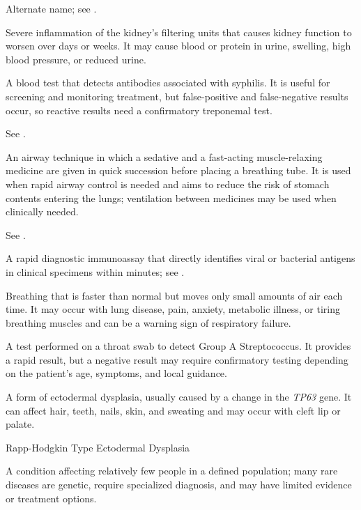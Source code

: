  Alternate name; see .

 Severe inflammation of the kidney’s filtering units that causes kidney function to worsen over days or weeks. It may cause blood or protein in urine, swelling, high blood pressure, or reduced urine.

 A blood test that detects antibodies associated with syphilis. It is useful for screening and monitoring treatment, but false-positive and false-negative results occur, so reactive results need a confirmatory treponemal test.

 See .

 An airway technique in which a sedative and a fast-acting muscle-relaxing medicine are given in quick succession before placing a breathing tube. It is used when rapid airway control is needed and aims to reduce the risk of stomach contents entering the lungs; ventilation between medicines may be used when clinically needed.

 See .

 A rapid diagnostic immunoassay that directly identifies viral or bacterial antigens in clinical specimens within minutes; see .

 Breathing that is faster than normal but moves only small amounts of air each time. It may occur with lung disease, pain, anxiety, metabolic illness, or tiring breathing muscles and can be a warning sign of respiratory failure.

 A test performed on a throat swab to detect Group A Streptococcus. It provides a rapid
result, but a negative result may require confirmatory testing depending on the patient's age, symptoms, and local
guidance.

 A form of ectodermal dysplasia, usually caused by a change in the \textit{TP63} gene. It can affect hair, teeth, nails, skin, and sweating and may occur with cleft lip or palate.

\synonyms
Rapp-Hodgkin Type Ectodermal Dysplasia

 A condition affecting relatively few people in a defined population; many rare diseases are genetic, require specialized diagnosis, and may have limited evidence or treatment options.

